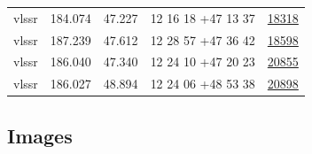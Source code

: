 \documentclass{article}
\begin{document}
\begin{longtable}{c|c|c|c|c}
vlssr & 184.074 & 47.227 & 12 16 18 +47 13 37 &  \href{http://banana.transientskp.org/r4/vlo_KmeulenTrap4P23/runningcatalog/18318}{18318} \\
vlssr & 187.239 & 47.612 & 12 28 57 +47 36 42 &  \href{http://banana.transientskp.org/r4/vlo_KmeulenTrap4P23/runningcatalog/18598}{18598} \\
vlssr & 186.040 & 47.340 & 12 24 10 +47 20 23 &  \href{http://banana.transientskp.org/r4/vlo_KmeulenTrap4P23/runningcatalog/20855}{20855} \\
vlssr & 186.027 & 48.894 & 12 24 06 +48 53 38 &  \href{http://banana.transientskp.org/r4/vlo_KmeulenTrap4P23/runningcatalog/20898}{20898} \\
\end{longtable}

\subsection{Images}
\end{document}
